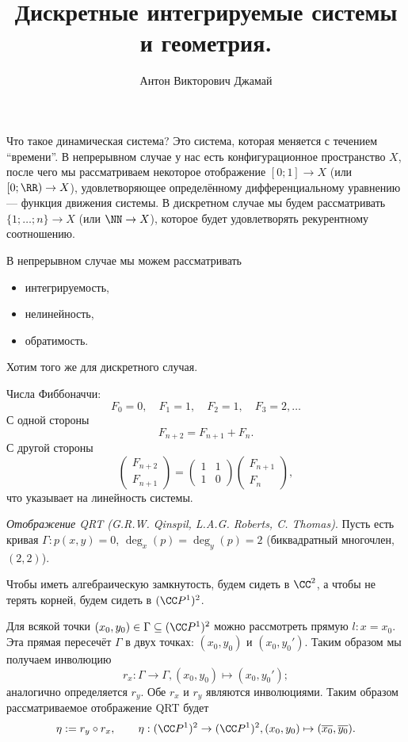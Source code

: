 \documentclass[12pt,a4paper]{article}
\title{Дискретные интегрируемые системы и геометрия.}
\author{Антон Викторович Джамай}
\begin{document}
    \maketitle

    Что такое динамическая система? Это система, которая меняется с течением ``времени''. В непрерывном случае у нас есть конфигурационное пространство $X$, после чего мы рассматриваем некоторое отображение $[0; 1] \to X$ (или $[0; \RR) \to X$), удовлетворяющее определённому дифференциальному уравнению --- функция движения системы. В дискретном случае мы будем рассматривать $\{1; \dots; n\} \to X$ (или $\NN \to X$), которое будет удовлетворять рекурентному соотношению.

    В непрерывном случае мы можем рассматривать
    \begin{itemize}
        \item интегрируемость,
        \item нелинейность,
        \item обратимость.
    \end{itemize}
    Хотим того же для дискретного случая.

    \begin{example}
        Числа Фиббоначчи:
        \[F_0 = 0, \quad F_1 = 1, \quad F_2 = 1, \quad F_3 = 2, \dots\]
        С одной стороны
        \[F_{n+2} = F_{n+1} + F_n.\]
        С другой стороны
        \[
            \begin{pmatrix}
                F_{n+2}\\
                F_{n+1}
            \end{pmatrix}
            =
            \begin{pmatrix}
                1& 1\\
                1& 0
            \end{pmatrix}
            \begin{pmatrix}
                F_{n+1}\\
                F_n
            \end{pmatrix},
        \]
        что указывает на линейность системы.
    \end{example}

    \begin{definition}
        \emph{Отображение QRT (G.R.W. Qinspil, L.A.G. Roberts, C. Thomas)}. Пусть есть кривая $\Gamma: p(x, y) = 0$, $\deg_x(p) = \deg_y(p) = 2$ (биквадратный многочлен, $(2, 2)$).

        Чтобы иметь алгебраическую замкнутость, будем сидеть в $\CC^2$, а чтобы не терять корней, будем сидеть в $(\CC P^1)^2$.

        Для всякой точки $(x_0, y_0) \in \Gamma \subseteq (\CC P^1)^2$ можно рассмотреть прямую $l: x = x_0$. Эта прямая пересечёт $\Gamma$ в двух точках: $(x_0, y_0)$ и $(x_0, y_0')$. Таким образом мы получаем инволюцию
        \[r_x: \Gamma \to \Gamma, (x_0, y_0) \mapsto (x_0, y_0');\]
        аналогично определяется $r_y$. Обе $r_x$ и $r_y$ являются инволюциями. Таким образом рассматриваемое отображение QRT будет
        \[\eta := r_y \circ r_x, \qquad \eta: (\CC P^1)^2 \to (\CC P^1)^2, (x_0, y_0) \mapsto (\overline{x_0}, \overline{y_0}).\]
    \end{definition}
\end{document}

